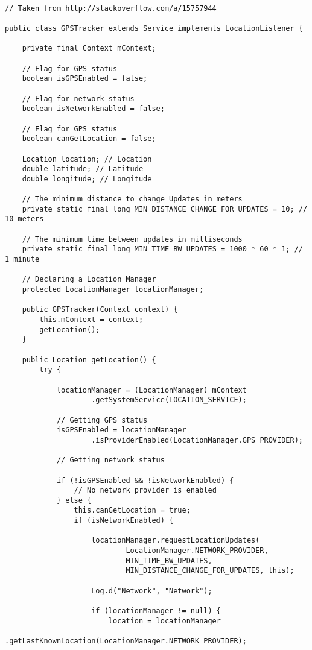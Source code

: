 \begin{lstlisting}

// Taken from http://stackoverflow.com/a/15757944

public class GPSTracker extends Service implements LocationListener {

    private final Context mContext;

    // Flag for GPS status
    boolean isGPSEnabled = false;

    // Flag for network status
    boolean isNetworkEnabled = false;

    // Flag for GPS status
    boolean canGetLocation = false;

    Location location; // Location
    double latitude; // Latitude
    double longitude; // Longitude

    // The minimum distance to change Updates in meters
    private static final long MIN_DISTANCE_CHANGE_FOR_UPDATES = 10; // 10 meters

    // The minimum time between updates in milliseconds
    private static final long MIN_TIME_BW_UPDATES = 1000 * 60 * 1; // 1 minute

    // Declaring a Location Manager
    protected LocationManager locationManager;

    public GPSTracker(Context context) {
        this.mContext = context;
        getLocation();
    }

    public Location getLocation() {
        try {

            locationManager = (LocationManager) mContext
                    .getSystemService(LOCATION_SERVICE);

            // Getting GPS status
            isGPSEnabled = locationManager
                    .isProviderEnabled(LocationManager.GPS_PROVIDER);

            // Getting network status

            if (!isGPSEnabled && !isNetworkEnabled) {
                // No network provider is enabled
            } else {
                this.canGetLocation = true;
                if (isNetworkEnabled) {

                    locationManager.requestLocationUpdates(
                            LocationManager.NETWORK_PROVIDER,
                            MIN_TIME_BW_UPDATES,
                            MIN_DISTANCE_CHANGE_FOR_UPDATES, this);

                    Log.d("Network", "Network");

                    if (locationManager != null) {
                        location = locationManager
                                .getLastKnownLocation(LocationManager.NETWORK_PROVIDER);


\end{lstlisting}
